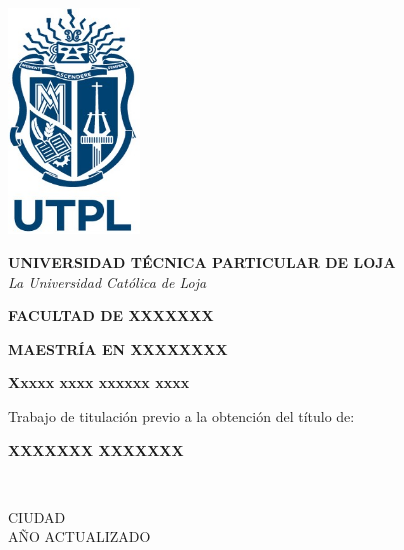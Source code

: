 \begin{center}
    \vspace*{2cm}
    
    \includegraphics[width=3.5cm]{figures/logo_utpl.jpg} %
    
    \vspace{1cm}
    
    {\Large \textbf{UNIVERSIDAD TÉCNICA PARTICULAR DE LOJA}}\\
    \vspace{0.5cm}
    {\large \textit{La Universidad Católica de Loja}}
    
    \vspace{2cm}
    
    {\large \textbf{FACULTAD DE XXXXXXX}}
    
    \vspace{1cm}
    
    {\large \textbf{MAESTRÍA EN XXXXXXXX}}
    
    \vspace{2cm}
    
    {\Large \textbf{Xxxxx xxxx xxxxxx xxxx}}
    
    \vspace{2cm}
    
    {\large Trabajo de titulación previo a la obtención del título de:}
    
    \vspace{1cm}
    
    {\large \textbf{XXXXXXX XXXXXXX}}
    
    \vspace{2cm}
    
    \begin{flushleft}
    \\
    \vspace{0.5cm}
    \end{flushleft}
    
    \vfill
    
    {\large CIUDAD}\\
    \vspace{0.5cm}
    {\large AÑO ACTUALIZADO}
    
    \end{center}